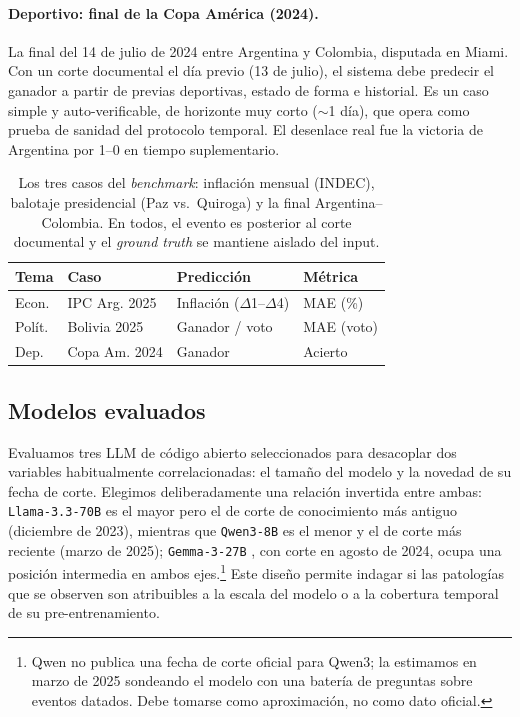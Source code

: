 \documentclass[11pt]{article}
\begin{document}
\paragraph{Deportivo: final de la Copa América (2024).} La final del 14 de julio de 2024 entre Argentina y Colombia, disputada en Miami. Con un corte documental el día previo (13 de julio), el sistema debe predecir el ganador a partir de previas deportivas, estado de forma e historial. Es un caso simple y auto-verificable, de horizonte muy corto ($\sim$1 día), que opera como prueba de sanidad del protocolo temporal. El desenlace real fue la victoria de Argentina por 1--0 en tiempo suplementario.

\begin{table}[t]
\centering
\small
\begin{tabular}{@{}llll@{}}
\toprule
\textbf{Tema} & \textbf{Caso} & \textbf{Predicción} & \textbf{Métrica} \\
\midrule
Econ. & IPC Arg. 2025 & Inflación ($\Delta$1--$\Delta$4) & MAE (\%) \\
Polít. & Bolivia 2025 & Ganador / voto & MAE (voto) \\
Dep. & Copa Am. 2024 & Ganador & Acierto \\
\bottomrule
\end{tabular}
\caption{Los tres casos del \textit{benchmark}: inflación mensual (INDEC), balotaje presidencial (Paz vs.\ Quiroga) y la final Argentina--Colombia. En todos, el evento es posterior al corte documental y el \textit{ground truth} se mantiene aislado del input.}
\label{tab:casos}
\end{table}

\subsection{Modelos evaluados}

Evaluamos tres LLM de código abierto seleccionados para desacoplar dos variables habitualmente correlacionadas: el tamaño del modelo y la novedad de su fecha de corte. Elegimos deliberadamente una relación invertida entre ambas: \texttt{Llama-3.3-70B} \citep{llama33} es el mayor pero el de corte de conocimiento más antiguo (diciembre de 2023), mientras que \texttt{Qwen3-8B} \citep{qwen3} es el menor y el de corte más reciente (marzo de 2025); \texttt{Gemma-3-27B} \citep{gemma3}, con corte en agosto de 2024, ocupa una posición intermedia en ambos ejes.\footnote{Qwen no publica una fecha de corte oficial para Qwen3; la estimamos en marzo de 2025 sondeando el modelo con una batería de preguntas sobre eventos datados. Debe tomarse como aproximación, no como dato oficial.} Este diseño permite indagar si las patologías que se observen son atribuibles a la escala del modelo o a la cobertura temporal de su pre-entrenamiento.
\end{document}
